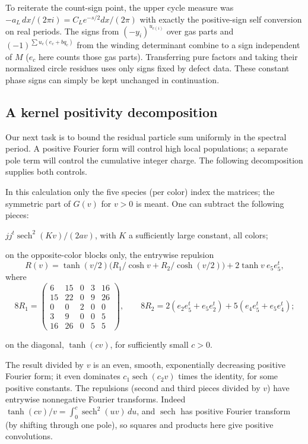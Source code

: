To reiterate the count-sign point, the upper cycle measure was \(-a_L\,dx/(2\pi i)=C_L e^{-s/2}dx/(2\pi)\) with exactly the positive-sign self conversion on real periods. The signs from \((-y_i)^{u_{c(i)}}\) over gas parts and \((-1)^{\sum u_c(e_c+bq_c)}\) from the winding determinant combine to a sign independent of \(M\) (\(e_c\) here counts those gas parts). Transferring pure factors and taking their normalized circle residues uses only signs fixed by defect data. These constant phase signs can simply be kept unchanged in continuation.

\subsection{A kernel positivity decomposition}\label{c01-c1-a-kernel-positivity-decomposition}

Our next task is to bound the residual particle sum uniformly in the spectral period. A positive Fourier form will control high local populations; a separate pole term will control the cumulative integer charge. The following decomposition supplies both controls.

In this calculation only the five species (per color) index the matrices; the symmetric part of \(G(v)\) for \(v>0\) is meant. One can subtract the following pieces:
\par\noindent\textbullet\quad \(j j^t\operatorname{sech}^2(Kv)/(2av)\), with \(K\) a sufficiently large constant, all colors;
\par\noindent\textbullet\quad on the opposite-color blocks only, the entrywise repulsion
\[
 R(v)=\tanh(v/2)\big(R_1/\cosh v+R_2/\cosh(v/2)\big)+2\tanh v\ e_5 e_5^t ,
\]
where
\[
 8 R_1=\begin{pmatrix}6&15&0&3&16\\15&22&0&9&26\\0&0&2&0&0\\3&9&0&0&5\\16&26&0&5&5\end{pmatrix},\qquad
 8 R_2=2(e_2e_5^t+e_5e_2^t)+5(e_4e_5^t+e_5e_4^t);
\]
\par\noindent\textbullet\quad on the diagonal, \(\tanh(c v)\), for sufficiently small \(c>0\).

The result divided by \(v\) is an even, smooth, exponentially decreasing positive Fourier form; it even dominates \(c_1\operatorname{sech}(c_2 v)\) times the identity, for some positive constants. The repulsions (second and third pieces divided by \(v\)) have entrywise nonnegative Fourier transforms. Indeed \(\tanh(c v)/v=\int_0^c\operatorname{sech}^2(u v)\,du\), and \(\operatorname{sech}\) has positive Fourier transform (by shifting through one pole), so squares and products here give positive convolutions.

